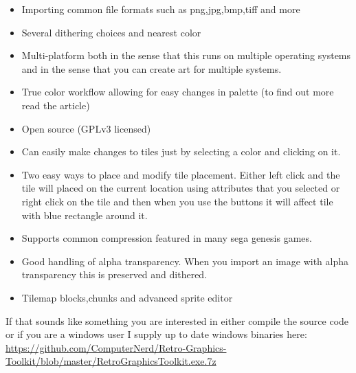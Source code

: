 \begin{itemize}
\itemsep1pt\parskip0pt
\item
  Importing common file formats such as png,jpg,bmp,tiff and more\\
\item
  Several dithering choices and nearest color\\
\item
  Multi-platform both in the sense that this runs on multiple operating
  systems and in the sense that you can create art for multiple
  systems.\\
\item
  True color workflow allowing for easy changes in palette (to find out
  more read the article)\\
\item
  Open source (GPLv3 licensed)\\
\item
  Can easily make changes to tiles just by selecting a color and
  clicking on it.\\
\item
  Two easy ways to place and modify tile placement. Either left click
  and the tile will placed on the current location using attributes that
  you selected or right click on the tile and then when you use the
  buttons it will affect tile with blue rectangle around it.\\
\item
  Supports common compression featured in many sega genesis games.\\
\item
  Good handling of alpha transparency. When you import an image with
  alpha transparency this is preserved and dithered.\\
\item
  Tilemap blocks,chunks and advanced sprite editor
\end{itemize}

If that sounds like something you are interested in either compile the
source code or if you are a windows user I supply up to date windows
binaries here:
\url{https://github.com/ComputerNerd/Retro-Graphics-Toolkit/blob/master/RetroGraphicsToolkit.exe.7z}
